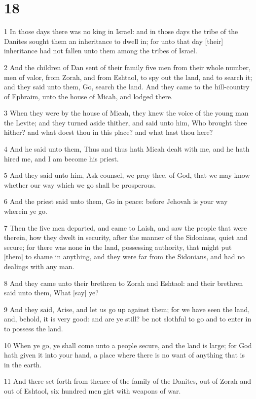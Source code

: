 \chapter{18}

\par 1 In those days there was no king in Israel: and in those days the tribe of the Danites sought them an inheritance to dwell in; for unto that day [their] inheritance had not fallen unto them among the tribes of Israel.
\par 2 And the children of Dan sent of their family five men from their whole number, men of valor, from Zorah, and from Eshtaol, to spy out the land, and to search it; and they said unto them, Go, search the land. And they came to the hill-country of Ephraim, unto the house of Micah, and lodged there.
\par 3 When they were by the house of Micah, they knew the voice of the young man the Levite; and they turned aside thither, and said unto him, Who brought thee hither? and what doest thou in this place? and what hast thou here?
\par 4 And he said unto them, Thus and thus hath Micah dealt with me, and he hath hired me, and I am become his priest.
\par 5 And they said unto him, Ask counsel, we pray thee, of God, that we may know whether our way which we go shall be prosperous.
\par 6 And the priest said unto them, Go in peace: before Jehovah is your way wherein ye go.
\par 7 Then the five men departed, and came to Laish, and saw the people that were therein, how they dwelt in security, after the manner of the Sidonians, quiet and secure; for there was none in the land, possessing authority, that might put [them] to shame in anything, and they were far from the Sidonians, and had no dealings with any man.
\par 8 And they came unto their brethren to Zorah and Eshtaol: and their brethren said unto them, What [say] ye?
\par 9 And they said, Arise, and let us go up against them; for we have seen the land, and, behold, it is very good: and are ye still? be not slothful to go and to enter in to possess the land.
\par 10 When ye go, ye shall come unto a people secure, and the land is large; for God hath given it into your hand, a place where there is no want of anything that is in the earth.
\par 11 And there set forth from thence of the family of the Danites, out of Zorah and out of Eshtaol, six hundred men girt with weapons of war.
